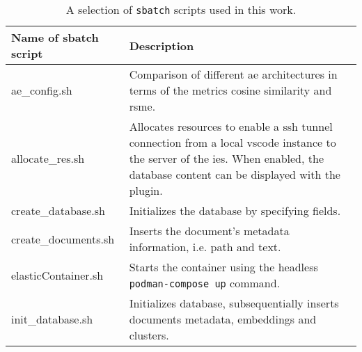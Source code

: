 \begin{table}[]
    \caption{A selection of \texttt{sbatch} scripts used in this work.}
    \begin{tabular}{|
    >{\columncolor[HTML]{EFEFEF}}p{} |p{}|}
    \hline
    \cellcolor[HTML]{C0C0C0}\textbf{Name of sbatch script} & \cellcolor[HTML]{C0C0C0}\textbf{Description}                                                                                                                                                                                                                      \\ \hline
    ae\_config.sh                                          & Comparison of different \ac{ae} architectures in terms of the metrics cosine similarity and \ac{rsme}.                                                                                                                                                                     \\ \hline
    allocate\_res.sh                                       & Allocates resources to enable a \ac{ssh} tunnel connection from a local \ac{vscode} instance to the server of the \ac{ies}. 
                                                                When enabled, the database content can be displayed with the \databaseName{} plugin.\\ \hline
    create\_database.sh                                    & Initializes the database by specifying fields.                                                                                                                                                                                                                    \\ \hline
    create\_documents.sh                                   & Inserts the document's metadata information, i.e. path and text.                                                                                                                                                                                                   \\ \hline
    elasticContainer.sh                                    & Starts the \databaseName{} container using the headless \texttt{podman-compose up} command.                                                                                                                                     \\ \hline
    init\_database.sh                                      & Initializes database, subsequentially inserts documents metadata, embeddings and clusters.                                                                                                                                                                        \\ \hline

\end{tabular}
\end{table}
